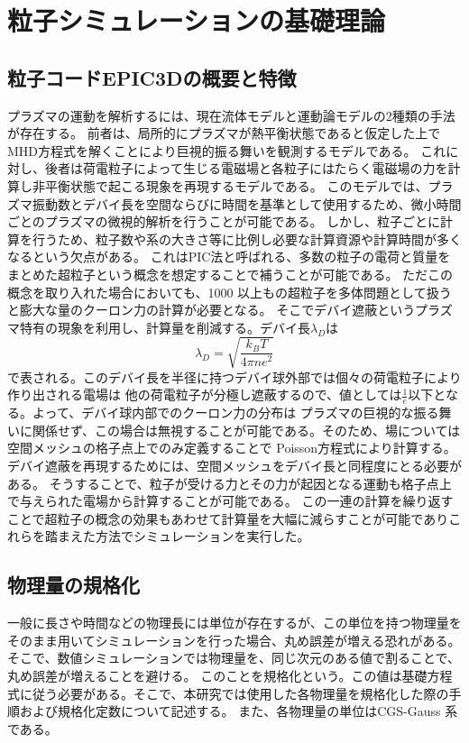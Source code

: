 \documentclass[a4paper,11pt,titlepage]{jsarticle}
\begin{document}
\section{粒子シミュレーションの基礎理論}
  \subsection{粒子コードEPIC3Dの概要と特徴}
  プラズマの運動を解析するには、現在流体モデルと運動論モデルの2種類の手法が存在する。
  前者は、局所的にプラズマが熱平衡状態であると仮定した上でMHD方程式を解くことにより巨視的振る舞いを観測するモデルである。
  これに対し、後者は荷電粒子によって生じる電磁場と各粒子にはたらく電磁場の力を計算し非平衡状態で起こる現象を再現するモデルである。
  このモデルでは、プラズマ振動数とデバイ長を空間ならびに時間を基準として使用するため、微小時間ごとのプラズマの微視的解析を行うことが可能である。
  しかし、粒子ごとに計算を行うため、粒子数や系の大きさ等に比例し必要な計算資源や計算時間が多くなるという欠点がある。
  これはPIC法と呼ばれる、多数の粒子の電荷と質量をまとめた超粒子という概念を想定することで補うことが可能である。
  ただこの概念を取り入れた場合においても、1000 以上もの超粒子を多体問題として扱うと膨大な量のクーロン力の計算が必要となる。
  そこでデバイ遮蔽というプラズマ特有の現象を利用し、計算量を削減する。デバイ長$\lambda_D$は
  \begin{equation}
    \label{3-1-1}
    \lambda_D = \sqrt{\frac{k_B T}{4\pi n e^2}}
  \end{equation}
  で表される。このデバイ長を半径に持つデバイ球外部では個々の荷電粒子により作り出される電場は
  他の荷電粒子が分極し遮蔽するので、値としては$\frac{1}{e}$以下となる。よって、デバイ球内部でのクーロン力の分布は
  プラズマの巨視的な振る舞いに関係せず、この場合は無視することが可能である。そのため、場については空間メッシュの格子点上でのみ定義することで
  Poisson方程式により計算する。デバイ遮蔽を再現するためには、空間メッシュをデバイ長と同程度にとる必要がある。
  そうすることで、粒子が受ける力とその力が起因となる運動も格子点上で与えられた電場から計算することが可能である。
  この一連の計算を繰り返すことで超粒子の概念の効果もあわせて計算量を大幅に減らすことが可能でありこれらを踏まえた方法でシミュレーションを実行した。

  \subsection{物理量の規格化}
  一般に長さや時間などの物理長には単位が存在するが、この単位を持つ物理量をそのまま用いてシミュレーションを行った場合、丸め誤差が増える恐れがある。\\
  そこで、数値シミュレーションでは物理量を、同じ次元のある値で割ることで、丸め誤差が増えることを避ける。
  このことを規格化という。この値は基礎方程式に従う必要がある。そこで、本研究では使用した各物理量を規格化した際の手順および規格化定数について記述する。
  また、各物理量の単位はCGS-Gauss 系である。\\
\end{document}
